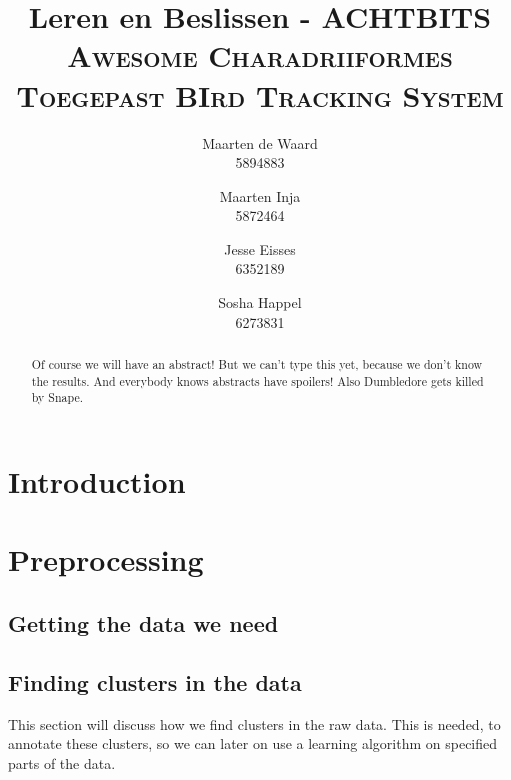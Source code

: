 \documentclass[a4paper,10pt]{article}
\title{Leren en Beslissen - ACHTBITS\\\large \textsc{Awesome Charadriiformes Toegepast
BIrd Tracking System}}
\author{Maarten de Waard\\5894883 \and Maarten Inja \\5872464 \and Jesse Eisses \\
6352189 \and Sosha Happel\\ 6273831}
\begin{document}
\maketitle
\begin{abstract}
Of course we will have an abstract! But we can't type this yet, because we don't
know the results. And everybody knows abstracts have spoilers! Also Dumbledore
gets killed by Snape.
\end{abstract}
\section{Introduction}

\section{Preprocessing}
 \subsection{Getting the data we need}
 
 \subsection{Finding clusters in the data}
 This section will discuss how we find clusters in the raw data. 
 This is needed, to annotate these clusters, so we can later on use a
 learning algorithm on specified parts of the data.
\end{document}
